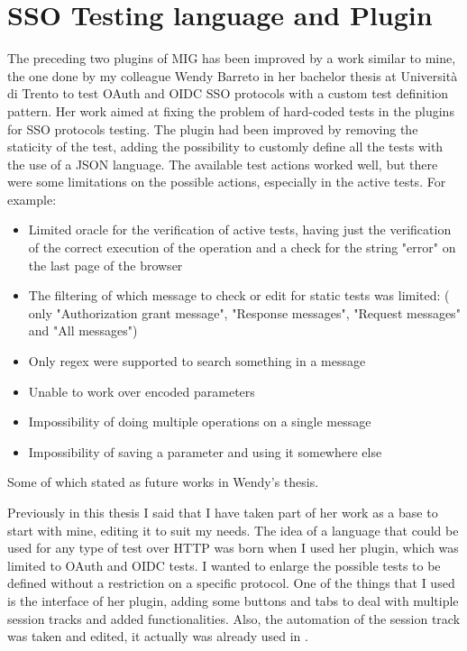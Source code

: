 \section{SSO Testing language and Plugin}
The preceding two plugins of MIG has been improved by a work similar to mine, the one done by my colleague Wendy Barreto \cite{wendy_barreto} in her bachelor thesis at Università di Trento to test \Gls{OAuth} and \Gls{OIDC} SSO protocols with a custom test definition pattern. Her work aimed at fixing the problem of hard-coded tests in the plugins for SSO protocols testing. The plugin had been improved by removing the staticity of the test, adding the possibility to customly define all the tests with the use of a JSON language.
The available test actions worked well, but there were some limitations on the possible actions, especially in the active tests. For example:
\begin{itemize}
    \item Limited oracle for the verification of active tests, having just the verification of the correct execution of the operation and a check for the string "error" on the last page of the browser
    \item The filtering of which message to check or edit for static tests was limited: ( only "Authorization grant message", "Response messages", "Request messages" and "All messages")
    \item Only regex were supported to search something in a message
    \item Unable to work over encoded parameters
    \item Impossibility of doing multiple operations on a single message
    \item Impossibility of saving a parameter and using it somewhere else
\end{itemize}
Some of which stated as future works in Wendy's thesis.

Previously in this thesis I said that I have taken part of her work as a base to start with mine, editing it to suit my needs. The idea of a language that could be used for any type of test over HTTP was born when I used her plugin, which was limited to \Gls{OAuth} and \Gls{OIDC} tests. I wanted to enlarge the possible tests to be defined without a restriction on a specific protocol. 
One of the things that I used is the interface of her plugin, adding some buttons and tabs to deal with multiple \gls{session track}s and added functionalities. Also, the automation of the \gls{session track} was taken and edited, it actually was already used in \cite{claudio_grisenti}\cite{stefano_facchini}.

